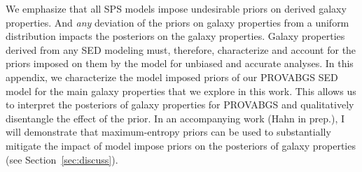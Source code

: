 We emphasize that all SPS models impose undesirable priors on derived galaxy
properties. 
And \emph{any} deviation of the priors on galaxy properties from a uniform
distribution impacts the posteriors on the galaxy properties. 
Galaxy properties derived from any SED modeling must, therefore, characterize
and account for the priors imposed on them by the model for unbiased and
accurate analyses. 
In this appendix, we characterize the model imposed priors of our PROVABGS SED
model for the main galaxy properties that we explore in this work. 
This allows us to interpret the posteriors of galaxy properties for PROVABGS
and qualitatively disentangle the effect of the prior. 
In an accompanying work (Hahn in prep.), I will demonstrate that
maximum-entropy priors can be used to substantially mitigate the impact of
model impose priors on the posteriors of galaxy properties
(see Section~\ref{sec:discuss}). 
